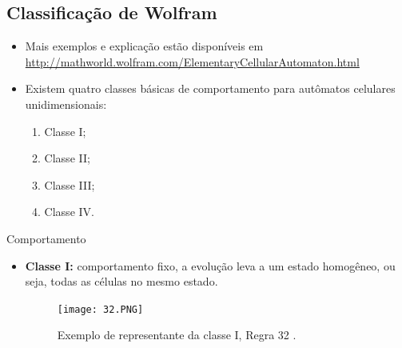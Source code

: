 \documentclass[compress, hide notes]{beamer}
\begin{document}
\subsection{Classificação de Wolfram}

\begin{frame}
	\begin{itemize}
    	\item Mais exemplos e explicação estão disponíveis em \url{http://mathworld.wolfram.com/ElementaryCellularAutomaton.html}
        \bigskip
        
        \bigskip
	
		\item Existem quatro classes básicas de comportamento para autômatos celulares unidimensionais:
        \begin{enumerate}
        	\setlength\itemsep{8pt}
			\item Classe I;
            \item Classe II;
            \item Classe III;
            \item Classe IV.
		\end{enumerate}
	\end{itemize}
\end{frame}

\begin{frame}{Comportamento \cite{ufmg}}
	
	\begin{itemize}
        
		\item \textbf{Classe I:} comportamento fixo, a evolução leva a um estado homogêneo, ou seja, todas as células no mesmo estado.	
	
		\begin{figure}[h]
											
			\center
																
			\texttt{[image: 32.PNG]}
			\caption{Exemplo de representante da classe I, Regra 32 \cite{ufmg}.}
												
		\end{figure}
		
	\end{itemize}
	
\end{frame}
\end{document}
